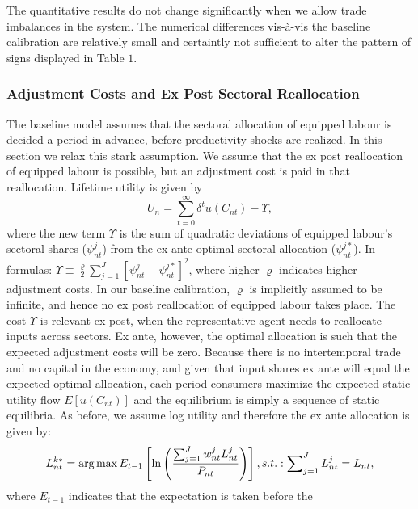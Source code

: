 \documentclass[12pt]{article}
\begin{document}
The quantitative results do not change significantly when we allow trade
imbalances in the system. The numerical differences vis-\`{a}-vis the
baseline calibration are relatively small and certaintly not sufficient to
alter the pattern of signs displayed in Table $1$.

\subsubsection{Adjustment Costs and Ex Post Sectoral Reallocation}

The baseline model assumes that the sectoral allocation of equipped labour
is decided a period in advance, before productivity shocks are realized. In
this section we relax this stark assumption. We assume that the ex post
reallocation of equipped labour is possible, but an adjustment cost is paid
in that reallocation. Lifetime utility is given by 
\begin{equation*}
U_{n}=\sum\limits_{t=0}^{\infty }\delta ^{t}u(C_{nt})-\Upsilon ,
\end{equation*}%
where the new term $\Upsilon $ is the sum of quadratic deviations of
equipped labour's sectoral shares ($\psi _{nt}^{j}$) from the ex ante
optimal sectoral allocation ($\psi _{nt}^{j\ast }$). In formulas: $\Upsilon
\equiv \frac{\varrho }{2}\sum_{j=1}^{J}\left[ \psi _{nt}^{j}-\psi
_{nt}^{j\ast }\right] ^{2}$, where higher $\varrho $ indicates higher
adjustment costs. In our baseline calibration, $\varrho $ is implicitly
assumed to be infinite, and hence no ex post reallocation of equipped labour
takes place. The cost $\Upsilon $ is relevant ex-post, when the
representative agent needs to reallocate inputs across sectors. Ex ante,
however, the optimal allocation is such that the expected adjustment costs
will be zero. Because there is no intertemporal trade and no capital in the
economy, and given that input shares ex ante will equal the expected optimal
allocation, each period consumers maximize the expected static utility flow $%
E\left[ u\left( C_{nt}\right) \right] $ and the equilibrium is simply a
sequence of static equilibria. As before, we assume log utility and
therefore the ex ante allocation is given by: 
\begin{equation}
L_{nt}^{k\ast }=\arg \max E_{t-1}\left[ \ln \left( \frac{%
\sum_{j=1}^{J}w_{nt}^{j}L_{nt}^{j}}{P_{nt}}\right) \right]
,s.t.:\sum\nolimits_{j=1}^{J}L_{nt}^{j}=L_{nt},  \label{eq:log:utility1}
\end{equation}%
where $E_{t-1}$ indicates that the expectation is taken before the
\end{document}
